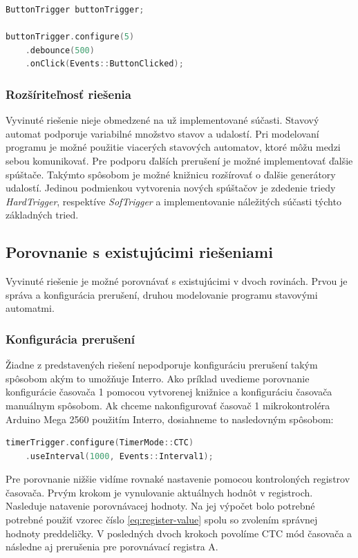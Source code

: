 \begin{lstlisting}[language=c++]         
ButtonTrigger buttonTrigger; 

buttonTrigger.configure(5)
    .debounce(500)
    .onClick(Events::ButtonClicked);
\end{lstlisting}

\subsubsection{Rozšíriteľnosť riešenia}

Vyvinuté riešenie nieje obmedzené na už implementované súčasti. Stavový automat podporuje variabilné množstvo stavov a udalostí. Pri modelovaní programu je možné použitie
viacerých stavových automatov, ktoré môžu medzi sebou komunikovať. Pre podporu ďalších prerušení
je možné implementovať ďalšie spúštače. Takýmto spôsobom je možné knižnicu rozšírovať o ďalšie generátory udalostí. Jedinou podmienkou vytvorenia nových spúštačov je
zdedenie triedy \textit{HardTrigger}, respektíve \textit{SofTrigger} a implementovanie náležitých súčasti týchto základných tried.

\subsection{Porovnanie s existujúcimi riešeniami}
Vyvinuté riešenie je možné porovnávať s existujúcimi v dvoch rovinách. Prvou je správa a konfigurácia prerušení, druhou modelovanie programu stavovými automatmi.

\subsubsection{Konfigurácia prerušení}

Žiadne z predstavených riešení nepodporuje konfiguráciu prerušení takým spôsobom akým to umožňuje Interro. Ako príklad uvedieme porovnanie konfigurácie časovača 1 pomocou vytvorenej
knižnice a konfiguráciu časovača manuálnym spôsobom. Ak chceme nakonfigurovať časovač 1 mikrokontroléra Arduino Mega 2560 použitím Interro, dosiahneme to nasledovným spôsobom:

\begin{lstlisting}[language=c++]      
timerTrigger.configure(TimerMode::CTC)
    .useInterval(1000, Events::Interval1);
\end{lstlisting}

Pre porovnanie nižšie vidíme rovnaké nastavenie pomocou kontroloných registrov časovača. Prvým krokom je vynulovanie aktuálnych hodnôt v registroch.
Nasleduje natavenie porovnávacej hodnoty. Na jej výpočet bolo potrebné potrebné použiť vzorec číslo \ref{eq:register-value} spolu so zvolením správnej hodnoty
preddeličky. V posledných dvoch krokoch povolíme CTC mód časovača a následne aj prerušenia pre porovnávací registra A.

